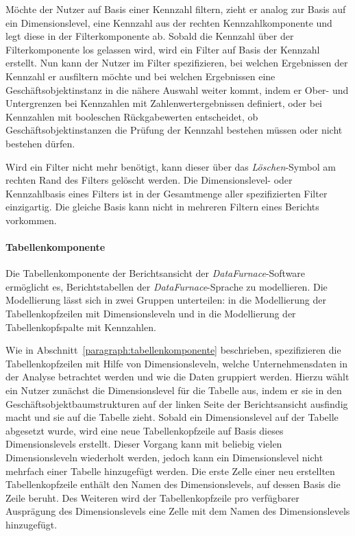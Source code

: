 \documentclass[
  language=german, %
  type=bachelor,%
  ngerman
]{isthesis}
\begin{document}
\begin{content}
  Möchte der Nutzer auf Basis einer Kennzahl filtern, zieht er analog zur
  Basis auf ein Dimensionslevel, eine Kennzahl aus der rechten
  Kennzahlkomponente und legt diese in der Filterkomponente ab. Sobald die
  Kennzahl über der Filterkomponente los gelassen wird, wird ein Filter auf
  Basis der Kennzahl erstellt. Nun kann der Nutzer im Filter spezifizieren, bei
  welchen Ergebnissen der Kennzahl er ausfiltern möchte und bei welchen
  Ergebnissen eine Geschäftsobjektinstanz in die nähere Auswahl weiter kommt,
  indem er \zB{} Ober- und Untergrenzen bei Kennzahlen mit
  Zahlenwertergebnissen definiert, oder bei Kennzahlen mit booleschen
  Rückgabewerten entscheidet, ob Geschäftsobjektinstanzen die Prüfung der
  Kennzahl bestehen müssen oder nicht bestehen dürfen.

  Wird ein Filter nicht mehr benötigt, kann dieser über das
  \textit{Löschen}-Symbol am rechten Rand des Filters gelöscht werden. Die
  Dimensionslevel- oder Kennzahlbasis eines Filters ist in der Gesamtmenge
  aller spezifizierten Filter einzigartig. Die gleiche Basis kann nicht in
  mehreren Filtern eines Berichts vorkommen.

  \paragraph{Tabellenkomponente}

  Die Tabellenkomponente der Berichtsansicht der \textit{DataFurnace}-Software
  ermöglicht es, Berichtstabellen der \textit{DataFurnace}-Sprache zu
  modellieren. Die Modellierung lässt sich in zwei Gruppen unterteilen: in die
  Modellierung der Tabellenkopfzeilen mit Dimensionsleveln und in die
  Modellierung der Tabellenkopfspalte mit Kennzahlen.

  Wie in Abschnitt~\ref{paragraph:tabellenkomponente} beschrieben,
  spezifizieren die Tabellenkopfzeilen mit Hilfe von Dimensionsleveln, welche
  Unternehmensdaten in der Analyse betrachtet werden und wie die Daten
  gruppiert werden. Hierzu wählt ein Nutzer zunächst die Dimensionslevel für
  die Tabelle aus, indem er sie in den Geschäftsobjektbaumstrukturen auf der
  linken Seite der Berichtsansicht ausfindig macht und sie auf die Tabelle
  zieht. Sobald ein Dimensionslevel auf der Tabelle abgesetzt wurde, wird eine
  neue Tabellenkopfzeile auf Basis dieses Dimensionslevels erstellt. Dieser
  Vorgang kann mit beliebig vielen Dimensionsleveln wiederholt werden, jedoch
  kann ein Dimensionslevel nicht mehrfach einer Tabelle hinzugefügt werden. Die
  erste Zelle einer neu erstellten Tabellenkopfzeile enthält den Namen des
  Dimensionslevels, auf dessen Basis die Zeile beruht. Des Weiteren wird der
  Tabellenkopfzeile pro verfügbarer Ausprägung des Dimensionslevels eine Zelle
  mit dem Namen des Dimensionslevels hinzugefügt.


\end{content}
\end{document}
